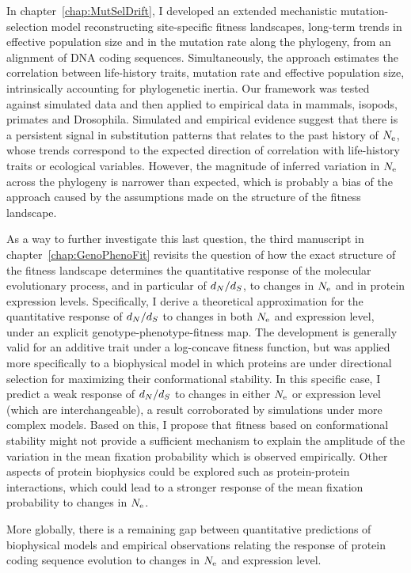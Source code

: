 In chapter~\ref{chap:MutSelDrift}, I developed an extended mechanistic mutation-selection model reconstructing site-specific fitness landscapes, long-term trends in effective population size and in the mutation rate along the phylogeny, from an alignment of \acrshort{DNA} coding sequences.
Simultaneously, the approach estimates the correlation between life-history traits, mutation rate and effective population size, intrinsically accounting for phylogenetic inertia.
Our framework was tested against simulated data and then applied to empirical data in mammals, isopods, primates and Drosophila.
Simulated and empirical evidence suggest that there is a persistent signal in substitution patterns that relates to the past history of $N_{\text{e}}$, whose trends correspond to the expected direction of correlation with life-history traits or ecological variables.
However, the magnitude of inferred variation in $N_{\text{e}}$ across the phylogeny is narrower than expected, which is probably a bias of the approach caused by the assumptions made on the structure of the fitness landscape.

As a way to further investigate this last question, the third manuscript in chapter~\ref{chap:GenoPhenoFit} revisits the question of how the exact structure of the fitness landscape determines the quantitative response of the molecular evolutionary process, and in particular of $d_N / d_S$, to changes in $N_{\text{e}}$ and in protein expression levels.
Specifically, I derive a theoretical approximation for the quantitative response of $d_N / d_S$ to changes in both $N_{\text{e}}$ and expression level, under an explicit genotype-phenotype-fitness map.
The development is generally valid for an additive trait under a log-concave fitness function, but was applied more specifically to a biophysical model in which proteins are under directional selection for maximizing their conformational stability.
In this specific case, I predict a weak response of $d_N / d_S$ to changes in either $N_{\text{e}}$ or expression level (which are interchangeable), a result corroborated by simulations under more complex models.
Based on this, I propose that fitness based on conformational stability might not provide a sufficient mechanism to explain the amplitude of the variation in the mean fixation probability which is observed empirically.
Other aspects of protein biophysics could be explored such as protein-protein interactions, which could lead to a stronger response of the mean fixation probability to changes in $N_{\text{e}}$.

More globally, there is a remaining gap between quantitative predictions of biophysical models and empirical observations relating the response of protein coding sequence evolution to changes in $N_{\text{e}}$ and expression level.



